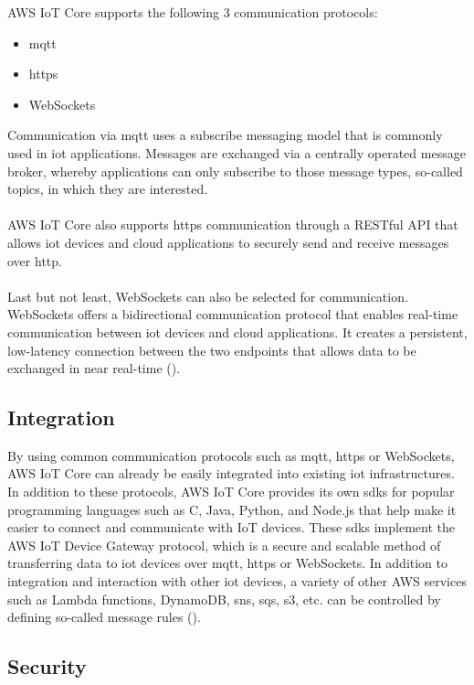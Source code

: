 AWS IoT Core supports the following 3 communication protocols:

\begin{itemize}
    \item \ac{mqtt}
    \item \ac{https}
    \item WebSockets
\end{itemize}
Communication via \ac{mqtt} uses a subscribe messaging model that is commonly used in \ac{iot} applications. 
Messages are exchanged via a centrally operated message broker, whereby applications can only subscribe to those message types, so-called topics, in which they are interested.
\\
\\
AWS IoT Core also supports \ac{https} communication through a RESTful API that allows \ac{iot} devices and cloud applications to securely send and receive messages over \ac{http}.
\\
\\
Last but not least, WebSockets can also be selected for communication. WebSockets offers a bidirectional communication protocol that enables real-time communication between \ac{iot} devices and cloud applications. 
It creates a persistent, low-latency connection between the two endpoints that allows data to be exchanged in near real-time ({\cite{ref02}}).

\subsection{Integration}

By using common communication protocols such as \ac{mqtt}, \ac{https} or WebSockets, AWS IoT Core can already be easily integrated into existing \ac{iot} infrastructures. 
In addition to these protocols, AWS IoT Core provides its own \ac{sdk}s for popular programming languages such as C, Java, Python, and Node.js that help make it easier to connect and communicate with IoT devices. 
These \ac{sdk}s implement the AWS IoT Device Gateway protocol, which is a secure and scalable method of transferring data to \ac{iot} devices over \ac{mqtt}, \ac{https} or WebSockets.
In addition to integration and interaction with other \ac{iot} devices, a variety of other AWS services such as Lambda functions, DynamoDB, \ac{sns}, \ac{sqs}, \ac{s3}, etc. can be controlled by defining so-called message rules (\cite{RefAwsIotCoreFeatures}).

\subsection{Security}

